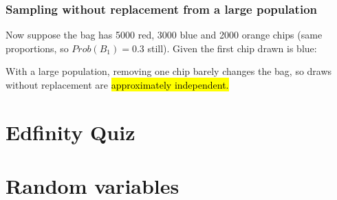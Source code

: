 \documentclass[slidestop,compress,mathserif]{beamer}
\newcommand{\soln}[1]{\textit{#1}}
\begin{document}

\begin{frame}
\frametitle{Sampling without replacement from a large population}

Now suppose the bag has 5000 red, 3000 blue and 2000 orange chips (same proportions, so $Prob(B_1) = 0.3$ still). Given the first chip drawn is blue:

\vspace{2mm}


\pause
\vspace{4mm}

With a large population, removing one chip barely changes the bag, so draws without replacement are \hl{approximately independent.}

\end{frame}








\section{Edfinity Quiz}


\section{Random variables}
\end{document}
